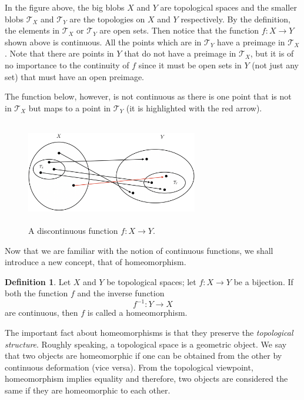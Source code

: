 \documentclass[12pt]{article}
\newcommand{\topology}{\mathcal{T}}                       %
\theoremstyle{definition}
\newtheorem*{definition}{Definition}
\begin{document}
In the figure above, the big blobs $X$ and $Y$ are topological spaces and the smaller blobs $\topology_X$
and $\topology_Y$ are the topologies on $X$ and $Y$ respectively. By the definition, the elements in $\topology_X$
or $\topology_Y$ are open sets. Then notice that the function $f : X \to Y$ shown above is continuous. All the points
which are in $\topology_Y$ have a preimage in $\topology_X$. Note that there are points in $Y$ that do not have a preimage
in $\topology_X$, but it is of no importance to the continuity of $f$ since it must be open sets in $Y$ (not just any set)
that must have an open preimage.

\bigskip

The function below, however, is not continuous as there is one point that is not in $\topology_X$
but maps to a point in $\topology_Y$ (it is highlighted with the red arrow).

\begin{figure}[H]
    \centering
    \includegraphics[width=7.5cm, height=4.5cm]{image/discontinuous-function}
    \caption*{A discontinuous function $f : X \to Y$.}
\end{figure}

\bigskip

Now that we are familiar with the notion of continuous functions, we shall introduce a new concept, that of homeomorphism.

\begin{definition}
\cite{7} Let $X$ and $Y$ be topological spaces; let $f : X \to Y$ be a bijection. If both the function $f$
and the inverse function
$$f^{-1} : Y \to X$$
are continuous, then $f$ is called a homeomorphism.
\end{definition}

The important fact about homeomorphisms is that they preserve the \textit{topological structure}.
Roughly speaking, a topological space is a geometric object. We say that two objects are homeomorphic
if one can be obtained from the other by continuous deformation (vice versa). From the topological viewpoint,
homeomorphism implies equality and therefore, two objects are considered the same if they are homeomorphic
to each other.
\end{document}
